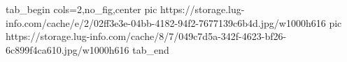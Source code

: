  
 
 
 
 


\ifcmt
  tab_begin cols=2,no_fig,center
     pic https://storage.lug-info.com/cache/e/2/02ff3e3e-04bb-4182-94f2-7677139c6b4d.jpg/w1000h616%
		 pic https://storage.lug-info.com/cache/8/7/049c7d5a-342f-4623-bf26-6c899f4ca610.jpg/w1000h616%
  tab_end
\fi
